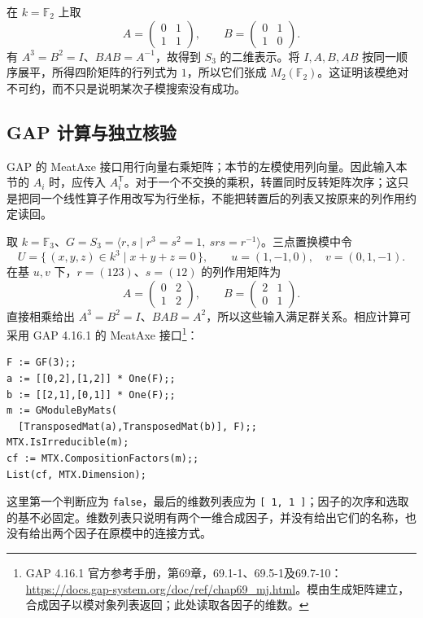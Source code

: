 在 \(k=\mathbb F_2\) 上取
\[
	A=\begin{pmatrix}0&1\\1&1\end{pmatrix},
	\qquad
	B=\begin{pmatrix}0&1\\1&0\end{pmatrix}.
\]
有 \(A^3=B^2=I\)、\(BAB=A^{-1}\)，故得到 \(S_3\) 的二维表示。将 \(I,A,B,AB\) 按同一顺序展平，所得四阶矩阵的行列式为 \(1\)，所以它们张成 \(M_2(\mathbb F_2)\)。这证明该模绝对不可约，而不只是说明某次子模搜索没有成功。

\subsection{GAP 计算与独立核验}
\label{b5:subsec:0807:03}

GAP 的 MeatAxe 接口用行向量右乘矩阵；本节的左模使用列向量。因此输入本节的 \(A_i\) 时，应传入 \(A_i^{\mathsf T}\)。对于一个不交换的乘积，转置同时反转矩阵次序；这只是把同一个线性算子作用改写为行坐标，不能把转置后的列表又按原来的列作用约定读回。

\ProseParagraphBreak
取 \(k=\mathbb F_3\)、\(G=S_3=\langle r,s\mid r^3=s^2=1,\ srs=r^{-1}\rangle\)。三点置换模中令
\[
	U=\{\,(x,y,z)\in k^3\mid x+y+z=0\,\},\qquad
	u=(1,-1,0),\quad v=(0,1,-1).
\]
在基 \(u,v\) 下，\(r=(123)\)、\(s=(12)\) 的列作用矩阵为
\begin{equation}\label{b5:eq:s3-modular-matrix-input}
	A=\begin{pmatrix}0&2\\1&2\end{pmatrix},
	\qquad
	B=\begin{pmatrix}2&1\\0&1\end{pmatrix}.
\end{equation}
直接相乘给出 \(A^3=B^2=I\)、\(BAB=A^2\)，所以这些输入满足群关系。相应计算可采用 GAP 4.16.1 的 MeatAxe 接口\footnote{GAP 4.16.1 官方参考手册，第69章，69.1-1、69.5-1及69.7-10：\url{https://docs.gap-system.org/doc/ref/chap69_mj.html}。模由生成矩阵建立，合成因子以模对象列表返回；此处读取各因子的维数。}：
\begin{verbatim}
F := GF(3);;
a := [[0,2],[1,2]] * One(F);;
b := [[2,1],[0,1]] * One(F);;
m := GModuleByMats(
  [TransposedMat(a),TransposedMat(b)], F);;
MTX.IsIrreducible(m);
cf := MTX.CompositionFactors(m);;
List(cf, MTX.Dimension);
\end{verbatim}
这里第一个判断应为 \texttt{false}，最后的维数列表应为 \texttt{[ 1, 1 ]}；因子的次序和选取的基不必固定。维数列表只说明有两个一维合成因子，并没有给出它们的名称，也没有给出两个因子在原模中的连接方式。

